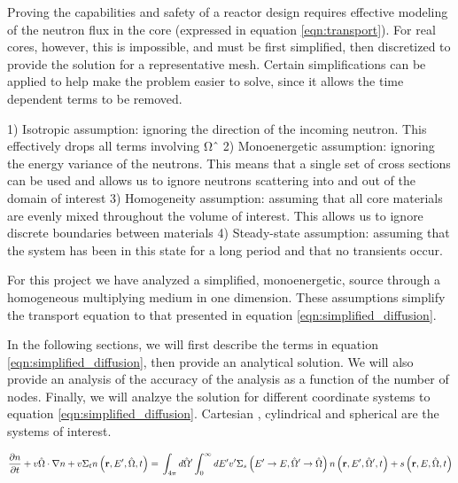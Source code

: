\documentclass[../main.tex]{subfiles}
\begin{document}
Proving the capabilities and safety of a reactor design requires effective modeling of the neutron flux in the core (expressed in equation \ref{eqn:transport}). For real cores, however, this is impossible, and must be first simplified, then discretized to provide the solution for a representative mesh. Certain simplifications can be applied to help make the problem easier to solve, since it allows the time dependent terms to be removed.

1) Isotropic assumption: ignoring the direction of the incoming neutron. This effectively drops all terms involving Ωˆ
2) Monoenergetic assumption: ignoring the energy variance of the neutrons. This means that a single set of cross sections
can be used and allows us to ignore neutrons scattering into and out of the domain of interest
3) Homogeneity assumption: assuming that all core materials are evenly mixed throughout the volume of interest. This
allows us to ignore discrete boundaries between materials
4) Steady-state assumption: assuming that the system has been in this state for a long period and that no transients occur.



	For this project we have analyzed a simplified, monoenergetic, source through a homogeneous multiplying medium in one dimension. These assumptions simplify the transport equation to that presented in equation \ref{eqn:simplified_diffusion}.

	In the following sections, we will first describe the terms in equation \ref{eqn:simplified_diffusion}, then provide an analytical solution. We will also provide an analysis of the accuracy of the analysis as a function of the number of nodes. Finally, we will analzye the solution for different coordinate systems to equation \ref{eqn:simplified_diffusion}.  Cartesian , cylindrical and spherical are the systems of interest.

	\begin{equation}
		\pdv{n}{t} + v \hat{\Omega} \cdot \nabla n + v \Sigma_t n \left( \mathbf{r}, E^\prime, \hat{\Omega}, t \right) = \\ \int_{4\pi} d \hat{\Omega} ^\prime \int_0^{\infty} dE ^\prime v^\prime \Sigma_s\left( E ^\prime \rightarrow E, \hat{\Omega} ^\prime \rightarrow \hat{\Omega} \right) n\left( \mathbf{r}, E ^\prime, \hat{\Omega} ^\prime, t \right) + s\left( \mathbf{r}, E, \hat{\Omega}, t \right)
		\label{eqn:transport}
	\end{equation}
  
\end{document}
